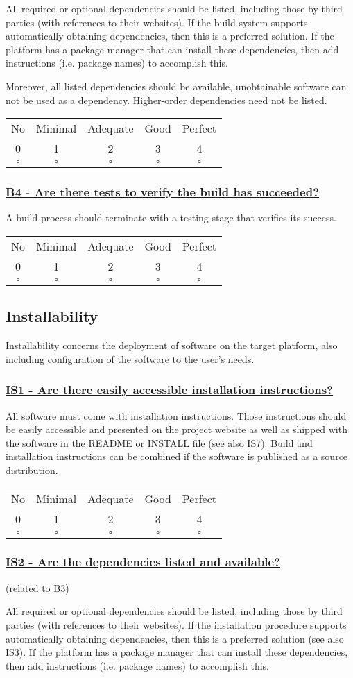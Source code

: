 \documentclass[a4paper,11pt]{article}
\newcommand{\criterion}[2]{\subsubsection*{\underline{#1 - #2}}\label{id:#1}}
\newcommand\CheckTable{%
  \begin{tabular}{ccccc}
    No & Minimal & Adequate & Good & Perfect \\
    0 & 1 & 2 & 3 & 4 \\
    \hline
    $\square$ & $\square$ & $\square$ & $\square$ & $\square$ \\
  \end{tabular}%
}
\begin{document}
All required or optional dependencies should be listed, including those by
third parties (with references to their websites). If the build system supports
automatically obtaining dependencies, then this is a preferred solution. If the
platform has a package manager that can install these dependencies, then add
instructions (i.e. package names) to accomplish this.

Moreover, all listed dependencies should be available, unobtainable software
can not be used as a dependency. Higher-order dependencies need not be listed.

\CheckTable

\newcommand{\bFourID}{B4}
\newcommand{\bFourText}{Are there tests to verify the build has succeeded?}
\criterion{\bFourID}{\bFourText}

A build process should terminate with a testing stage that verifies its success.

\CheckTable

\subsection{Installability}\label{sec:ins}

Installability concerns the deployment of software on the target platform, also
including configuration of the software to the user's needs.

\newcommand{\isOneID}{IS1}
\newcommand{\isOneText}{Are there easily accessible installation instructions?}
\criterion{\isOneID}{\isOneText}

All software must come with installation instructions. Those instructions should
be easily accessible and presented on the project website as well as shipped
with the software in the README or INSTALL file (see also IS7). Build and installation
instructions can be combined if the software is published as a source
distribution.

\CheckTable

\newcommand{\isTwoID}{IS2}
\newcommand{\isTwoText}{Are the dependencies listed and available?}
\criterion{\isTwoID}{\isTwoText}
(related to B3)

All required or optional dependencies should be listed, including those by
third parties (with references to their websites). If the installation
procedure supports automatically obtaining dependencies, then this is a
preferred solution (see also IS3). If the platform has a package manager that
can install these dependencies, then add instructions (i.e. package names) to
accomplish this.
\end{document}

